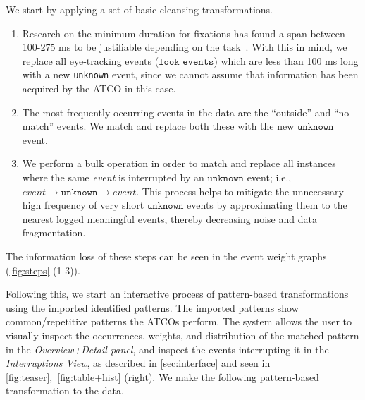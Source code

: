 \documentclass[camera]{vgtc}                          %
\begin{document}
We start by applying a set of basic cleansing transformations. 
\renewcommand{\theenumi}{\arabic{enumi}}
\begin{enumerate}
    \itemsep0em
    \vspace{-4pt}
    \item Research on the minimum duration for fixations has found a span between 100-275 ms to be justifiable depending on the task~\cite{Salthouse1980Determinants, Irwin1992Visual, Blignaut2009Fixation}. With this in mind, we replace all eye-tracking events ($ \texttt{look\_events} $) which are less than 100 ms long with a new \texttt{unknown} event, since we cannot assume that information has been acquired by the ATCO in this case.
    
    \vspace{-4pt}
    \item The most frequently occurring events in the data are the ``outside'' and ``no-match'' events. We match and replace both these with the new $ \texttt{unknown} $ event.
    
    \vspace{-4pt}
    \item  We perform a bulk operation in order to match and replace all instances where the same \textit{event} is interrupted by an $ \texttt{unknown} $ event; i.e., $ \textit{event} \rightarrow \texttt{unknown} \rightarrow \textit{event} $. 
    This process helps to mitigate the unnecessary high frequency of very short $ \texttt{unknown} $ events by approximating them to the nearest logged meaningful events, thereby decreasing noise and data fragmentation.
\end{enumerate}
\vspace{-4pt}
The information loss of these steps can be seen in the event weight graphs (\autoref{fig:steps} (1-3)).

Following this, we start an interactive process of pattern-based transformations using the imported identified patterns. The imported patterns show common/repetitive patterns the ATCOs perform. The system allows the user to visually inspect the occurrences, weights, and distribution of the matched pattern in the \textit{Overview+Detail panel}, and inspect the events interrupting it in the \textit{Interruptions View}, as described in \autoref{sec:interface} and seen in \autoref{fig:teaser},~\autoref{fig:table+hist} (right). 
We make the following pattern-based transformation to the data. 
\end{document}
